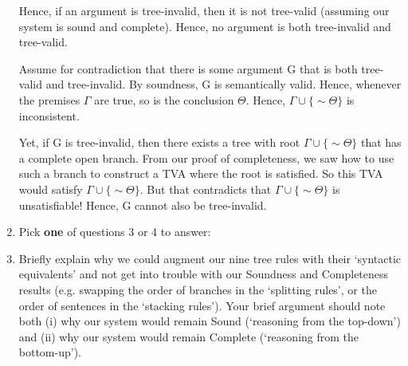 \documentclass[12pt]{article}
\def\enot{\ensuremath{{\sim}}} %
\let\oldsim\sim %
\renewcommand{\sim}{{\oldsim}} %
\begin{document}
\begin{enumerate}
Hence, if an argument is tree-invalid, then it is not tree-valid (assuming our system is sound and complete). Hence, no argument is both tree-invalid and tree-valid.


Assume for contradiction that there is some argument G that is both tree-valid and tree-invalid. By soundness, G is semantically valid. Hence, whenever the premises $\Gamma$ are true, so is the conclusion $\Theta$. Hence, $\Gamma \cup\{\enot \Theta\} $ is inconsistent. 

Yet, if G is tree-invalid, then there exists a tree with root $\Gamma \cup\{\enot \Theta\} $ that has a complete open branch. From our proof of completeness, we saw how to use such a branch to construct a TVA where the root is satisfied. So this TVA would satisfy $\Gamma \cup\{ \enot \Theta\} $. But that contradicts that $\Gamma \cup\{ \enot \Theta\} $ is unsatisfiable! Hence, G cannot also be tree-invalid. 

\newpage

\item[] \begin{center} Pick \textbf{one} of questions 3 or 4 to answer: %
\end{center}

\item Briefly explain why we could augment our nine tree rules with their `syntactic equivalents' and not get into trouble with our Soundness and Completeness results (e.g. swapping the order of branches in the `splitting rules', or the order of sentences in the `stacking rules'). Your brief argument should note both (i) why our system would remain Sound (`reasoning from the top-down') and (ii) why our system would remain Complete (`reasoning from the bottom-up'). \\ 



\end{enumerate}
\end{document}
